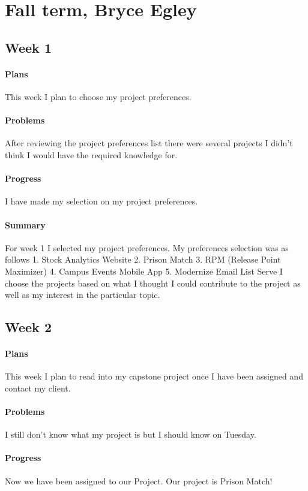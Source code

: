 \documentclass{article}
\begin{document}
\section{Fall term, Bryce Egley}
\subsection{Week 1}
\paragraph{Plans}
This week I plan to choose my project preferences. 
\paragraph{Problems}
After reviewing the project preferences list there were several projects I didn't think I would have the required knowledge for.
\paragraph{Progress}
I have made my selection on my project preferences.
\paragraph{Summary}
For week 1 I selected my project preferences. My preferences selection was as follows 1. Stock Analytics Website 2. Prison Match 3. RPM (Release Point Maximizer) 4. Campus Events Mobile App 5. Modernize Email List Serve I choose the projects based on what I thought I could contribute to the project as well as  my interest in the particular topic.
\subsection{Week 2}
\paragraph{Plans}
 This week I plan to read into my capstone project once I have been assigned and contact my client.
\paragraph{Problems}
I still don't know what my project is but I should know on Tuesday. 
\paragraph{Progress}
Now we have been assigned to our Project. Our project is Prison Match!
\end{document}
